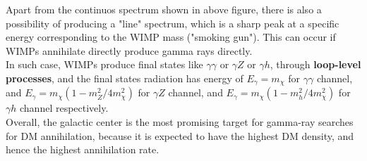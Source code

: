 \bigskip \noindent
\begin{intuition}
    Apart from the continuos spectrum shown in above figure, there is also a possibility of producing a "line" spectrum, which is a sharp peak at a specific energy corresponding to the WIMP mass ("smoking gun"). This can occur if WIMPs annihilate directly produce gamma rays directly. \\

    In such case, WIMPs produce final states like $\gamma \gamma$ or $\gamma Z$ or $\gamma h$, through \textbf{loop-level processes}, and the final states radiation has energy of $E_\gamma = m_\chi$ for $\gamma \gamma$ channel, and $E_\gamma = m_\chi (1 - m_Z^2 / 4 m_\chi^2)$ for $\gamma Z$ channel, and $E_\gamma = m_\chi (1 - m_h^2 / 4 m_\chi^2)$ for $\gamma h$ channel respectively. \\

    Overall, the galactic center is the most promising target for gamma-ray searches for DM annihilation, because it is expected to have the highest DM density, and hence the highest annihilation rate. 
\end{intuition}


